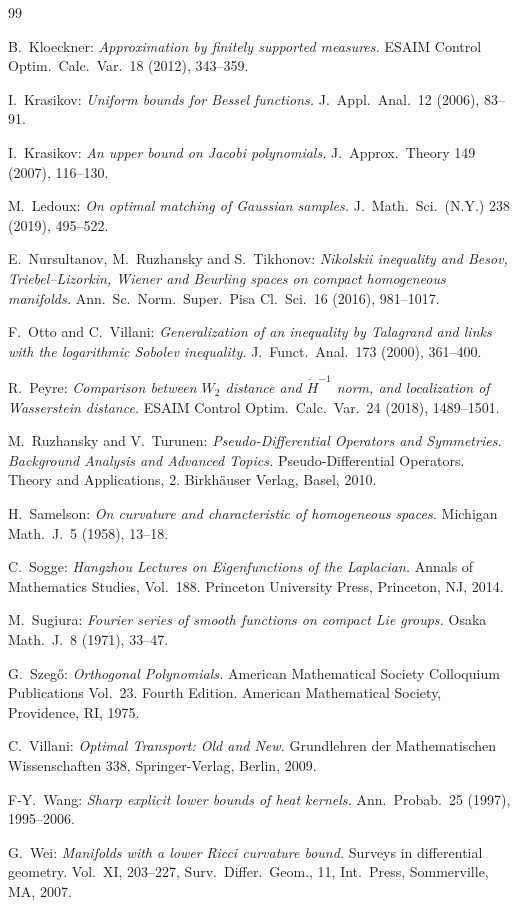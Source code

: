 \documentclass[11pt,a4paper]{article}
\theoremstyle{definition}
\begin{document}
\begin{thebibliography}{99}
{ B.\ Kloeckner: \textit{Approximation by finitely supported measures.} ESAIM Control Optim.\ Calc.\ Var.\ 18 (2012), 343--359.

 I.\ Krasikov: \textit{Uniform bounds for Bessel functions.} J.\ Appl.\ Anal.\ 12 (2006), 83--91.

 I.\ Krasikov: \textit{An upper bound on Jacobi polynomials.} J.\ Approx.\ Theory 149 (2007), 116--130.

 M.\ Ledoux: \textit{On optimal matching of Gaussian samples.} J.\ Math.\ Sci.\ (N.Y.) 238 (2019), 495--522.


 E.\ Nursultanov, M.\ Ruzhansky and S.\ Tikhonov: \textit{Nikolskii inequality and Besov, Triebel--Lizorkin, Wiener and Beurling spaces on compact homogeneous manifolds.} Ann.\ Sc.\ Norm.\ Super.\ Pisa Cl.\ Sci.\ 16 (2016), 981--1017.

 F.\ Otto and C.\ Villani: \textit{Generalization of an inequality by Talagrand and links with the logarithmic Sobolev inequality.} J.\ Funct.\ Anal.\ 173 (2000), 361--400.

 R.\ Peyre: \textit{Comparison between $W_2$ distance and $\dot{H}^{-1}$ norm, and localization of Wasserstein distance.} ESAIM Control Optim.\ Calc.\ Var.\ 24 (2018), 1489--1501.

 M.\ Ruzhansky and V.\ Turunen: \textit{Pseudo-Differential Operators and Symmetries. Background Analysis and Advanced Topics.} Pseudo-Differential Operators. Theory and Applications, 2. Birkh\"auser Verlag, Basel, 2010.

 H.\ Samelson: \textit{On curvature and characteristic of homogeneous spaces.} Michigan Math.\ J.\ 5 (1958), 13--18.

 C.\ Sogge: \textit{Hangzhou Lectures on Eigenfunctions of the Laplacian.} Annals of Mathematics Studies, Vol.\ 188. Princeton University Press, Princeton, NJ, 2014.

 M.\ Sugiura: \textit{Fourier series of smooth functions on compact Lie groups.} Osaka Math.\ J.\ 8 (1971), 33--47.

 G.\ Szeg\H{o}: \textit{Orthogonal Polynomials.} American Mathematical Society Colloquium Publications Vol.\ 23. Fourth Edition. American Mathematical Society, Providence, RI, 1975.

 C.\ Villani: \textit{Optimal Transport: Old and New.} Grundlehren der Mathematischen Wissenschaften 338, Springer-Verlag, Berlin, 2009.

 F-Y.\ Wang: \textit{Sharp explicit lower bounds of heat kernels.} Ann.\ Probab.\ 25 (1997), 1995--2006.

 G.\ Wei: \textit{Manifolds with a lower Ricci curvature bound.} Surveys in differential geometry. Vol.\ XI, 203--227, Surv.\ Differ.\ Geom., 11, Int.\ Press, Sommerville, MA, 2007.

}
\end{thebibliography}
\end{document}
